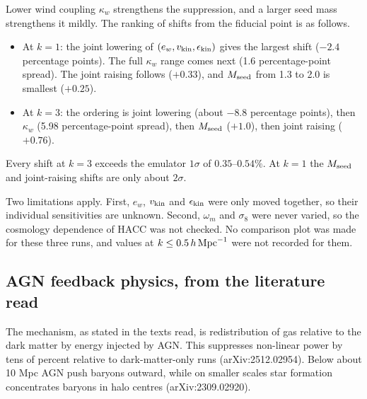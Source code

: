 \documentclass[11pt,a4paper]{article}
\begin{document}
Lower wind coupling $\kappa_w$ strengthens the suppression, and a larger seed mass strengthens it mildly. The ranking of shifts from the fiducial point is as follows.
\begin{itemize}
\item At $k=1$: the joint lowering of $(e_w, v_{\rm kin}, \epsilon_{\rm kin})$ gives the largest shift ($-2.4$ percentage points). The full $\kappa_w$ range comes next (1.6 percentage-point spread). The joint raising follows ($+0.33$), and $M_{\rm seed}$ from 1.3 to 2.0 is smallest ($+0.25$).
\item At $k=3$: the ordering is joint lowering (about $-8.8$ percentage points), then $\kappa_w$ (5.98 percentage-point spread), then $M_{\rm seed}$ ($+1.0$), then joint raising ($+0.76$).
\end{itemize}
Every shift at $k=3$ exceeds the emulator $1\sigma$ of $0.35$--$0.54\%$. At $k=1$ the $M_{\rm seed}$ and joint-raising shifts are only about $2\sigma$.

Two limitations apply. First, $e_w$, $v_{\rm kin}$ and $\epsilon_{\rm kin}$ were only moved together, so their individual sensitivities are unknown. Second, $\omega_m$ and $\sigma_8$ were never varied, so the cosmology dependence of HACC was not checked. No comparison plot was made for these three runs, and values at $k\leq0.5\,h\,{\rm Mpc}^{-1}$ were not recorded for them.

\subsection{AGN feedback physics, from the literature read}

The mechanism, as stated in the texts read, is redistribution of gas relative to the dark matter by energy injected by AGN. This suppresses non-linear power by tens of percent relative to dark-matter-only runs (arXiv:2512.02954). Below about 10 Mpc AGN push baryons outward, while on smaller scales star formation concentrates baryons in halo centres (arXiv:2309.02920).
\end{document}
